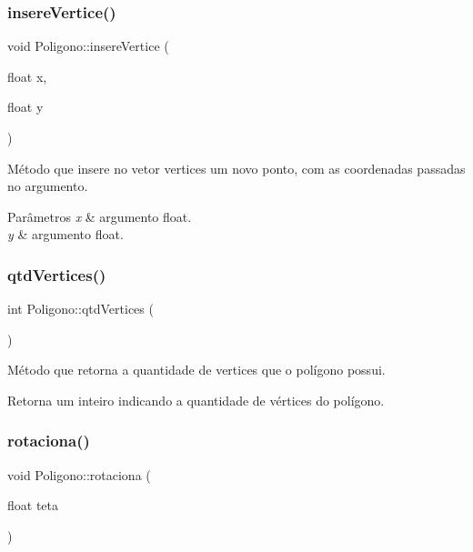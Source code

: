 \subsubsection{\texorpdfstring{insere\+Vertice()}{insereVertice()}}
{\footnotesize\ttfamily void Poligono\+::insere\+Vertice (\begin{DoxyParamCaption}\item[{float}]{x,  }\item[{float}]{y }\end{DoxyParamCaption})}



Método que insere no vetor \textquotesingle{}vertices\textquotesingle{} um novo ponto, com as coordenadas passadas no argumento. 


\begin{DoxyParams}{Parâmetros}
{\em x} & argumento float. \\
\hline
{\em y} & argumento float. \\
\hline
\end{DoxyParams}
\mbox{\label{classPoligono_ae2c1c915b4a72104724d1302138e7caa}} 
\subsubsection{\texorpdfstring{qtd\+Vertices()}{qtdVertices()}}
{\footnotesize\ttfamily int Poligono\+::qtd\+Vertices (\begin{DoxyParamCaption}{ }\end{DoxyParamCaption})}



Método que retorna a quantidade de vertices que o polígono possui. 

\begin{DoxyReturn}{Retorna}
um inteiro indicando a quantidade de vértices do polígono. 
\end{DoxyReturn}
\mbox{\label{classPoligono_a937c0e2bec60140fcc7b7bde5d64d339}} 
\subsubsection{\texorpdfstring{rotaciona()}{rotaciona()}}
{\footnotesize\ttfamily void Poligono\+::rotaciona (\begin{DoxyParamCaption}\item[{float}]{teta }\end{DoxyParamCaption})}



